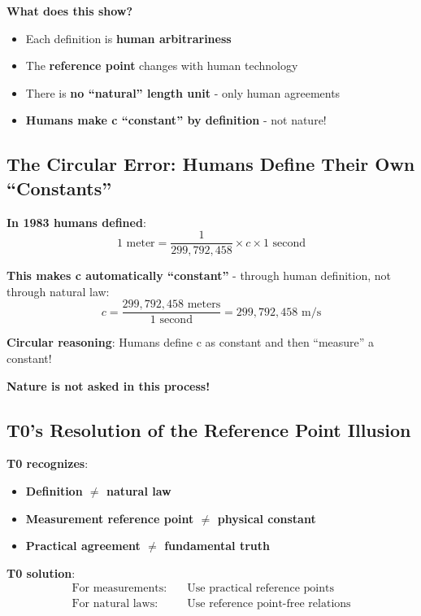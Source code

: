 	\textbf{What does this show?}
	\begin{itemize}
		\item Each definition is \textbf{human arbitrariness}
		\item The \textbf{reference point} changes with human technology
		\item There is \textbf{no ``natural'' length unit} - only human agreements
		\item \textbf{Humans make c ``constant'' by definition} - not nature!
	\end{itemize}
	
	\subsection{The Circular Error: Humans Define Their Own ``Constants''}
	
	\textbf{In 1983 humans defined}:
	\begin{equation}
		1 \text{ meter} = \frac{1}{299,792,458} \times c \times 1 \text{ second}
	\end{equation}
	
	\textbf{This makes c automatically ``constant''} - through human definition, not through natural law:
	\begin{equation}
		c = \frac{299,792,458 \text{ meters}}{1 \text{ second}} = 299,792,458 \text{ m/s}
	\end{equation}
	
	\textbf{Circular reasoning}: Humans define c as constant and then ``measure'' a constant!
	
	\textbf{Nature is not asked in this process!}
	
	\subsection{T0's Resolution of the Reference Point Illusion}
	
	\textbf{T0 recognizes}:
	\begin{itemize}
		\item \textbf{Definition $\neq$ natural law}
		\item \textbf{Measurement reference point $\neq$ physical constant}
		\item \textbf{Practical agreement $\neq$ fundamental truth}
	\end{itemize}
	
	\textbf{T0 solution}:
	\begin{align}
		\text{For measurements:} \quad &\text{Use practical reference points} \\
		\text{For natural laws:} \quad &\text{Use reference point-free relations}
	\end{align}
	
